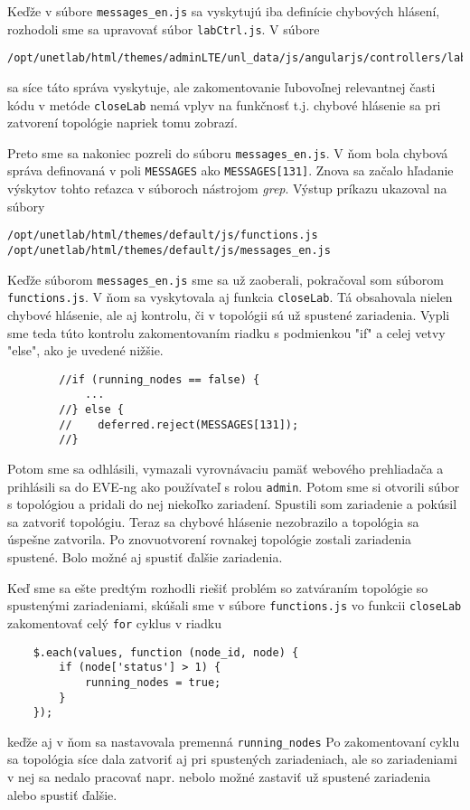 Keďže v súbore \texttt{messages\_en.js} sa vyskytujú iba definície chybových hlásení, rozhodoli sme sa upravovať súbor \texttt{labCtrl.js}. V súbore
\begin{verbatim}
/opt/unetlab/html/themes/adminLTE/unl_data/js/angularjs/controllers/lab/labCtrl.js
\end{verbatim}
sa síce táto správa vyskytuje, ale zakomentovanie ľubovoľnej relevantnej časti kódu v metóde \texttt{closeLab} nemá vplyv na funkčnosť t.j. chybové hlásenie sa pri zatvorení topológie napriek tomu zobrazí.

Preto sme sa nakoniec pozreli do súboru \texttt{messages\_en.js}. V ňom bola chybová správa definovaná v poli \texttt{MESSAGES} ako \texttt{MESSAGES[131]}. Znova sa začalo hľadanie výskytov tohto reťazca v súboroch nástrojom \emph{grep}. Výstup príkazu ukazoval na súbory
\begin{verbatim}
/opt/unetlab/html/themes/default/js/functions.js
/opt/unetlab/html/themes/default/js/messages_en.js
\end{verbatim}

Keďže súborom \texttt{messages\_en.js} sme sa už zaoberali, pokračoval som súborom \texttt{functions.js}. V ňom sa vyskytovala aj funkcia \texttt{closeLab}. Tá obsahovala nielen chybové hlásenie, ale aj kontrolu, či v topológii sú už spustené zariadenia. Vypli sme teda túto kontrolu zakomentovaním riadku s podmienkou "if" a celej vetvy "else", ako je uvedené nižšie.
\begin{verbatim}
        //if (running_nodes == false) {
            ...
        //} else {
        //    deferred.reject(MESSAGES[131]);
        //}
\end{verbatim}

Potom sme sa odhlásili, vymazali vyrovnávaciu pamäť webového prehliadača a prihlásili sa do EVE-ng ako používateľ s rolou \texttt{admin}. Potom sme si otvorili súbor s topológiou a pridali do nej niekoľko zariadení. Spustili som zariadenie a pokúsil sa zatvoriť topológiu. Teraz sa chybové hlásenie nezobrazilo a topológia sa úspešne zatvorila. Po znovuotvorení rovnakej topológie zostali zariadenia spustené. Bolo možné aj spustiť ďalšie zariadenia.

Keď sme sa ešte predtým rozhodli riešiť problém so zatváraním topológie so spustenými zariadeniami, skúšali sme v súbore \texttt{functions.js} vo funkcii \texttt{closeLab} zakomentovať celý \texttt{for} cyklus v riadku 
\begin{verbatim}
    $.each(values, function (node_id, node) {
        if (node['status'] > 1) {
            running_nodes = true;
        }
    });
\end{verbatim}
keďže aj v ňom sa nastavovala premenná \texttt{running\_nodes} Po zakomentovaní cyklu sa topológia síce dala zatvoriť aj pri spustených zariadeniach, ale so zariadeniami v nej sa nedalo pracovať napr. nebolo možné zastaviť už spustené zariadenia alebo spustiť ďalšie.

